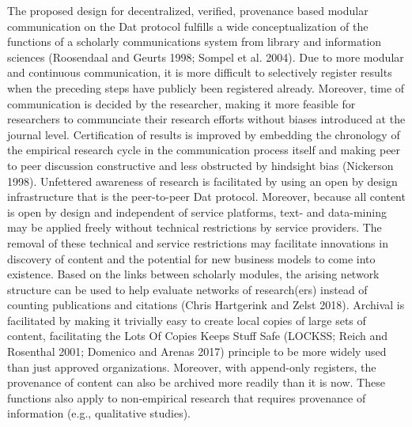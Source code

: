\documentclass[a4paper]{article}
\begin{document}
The proposed design for decentralized, verified, provenance based
modular communication on the Dat protocol fulfills a wide
conceptualization of the functions of a scholarly communications system
from library and information sciences (Roosendaal and Geurts 1998;
Sompel et al. 2004). Due to more modular and continuous communication,
it is more difficult to selectively register results when the preceding
steps have publicly been registered already. Moreover, time of
communication is decided by the researcher, making it more feasible for
researchers to communciate their research efforts without biases
introduced at the journal level. Certification of results is improved by
embedding the chronology of the empirical research cycle in the
communication process itself and making peer to peer discussion
constructive and less obstructed by hindsight bias (Nickerson 1998).
Unfettered awareness of research is facilitated by using an open by
design infrastructure that is the peer-to-peer Dat protocol. Moreover,
because all content is open by design and independent of service
platforms, text- and data-mining may be applied freely without technical
restrictions by service providers. The removal of these technical and
service restrictions may facilitate innovations in discovery of content
and the potential for new business models to come into existence. Based
on the links between scholarly modules, the arising network structure
can be used to help evaluate networks of research(ers) instead of
counting publications and citations (Chris Hartgerink and Zelst 2018).
Archival is facilitated by making it trivially easy to create local
copies of large sets of content, facilitating the Lots Of Copies Keeps
Stuff Safe (LOCKSS; Reich and Rosenthal 2001; Domenico and Arenas 2017)
principle to be more widely used than just approved organizations.
Moreover, with append-only registers, the provenance of content can also
be archived more readily than it is now. These functions also apply to
non-empirical research that requires provenance of information (e.g.,
qualitative studies).
\end{document}
